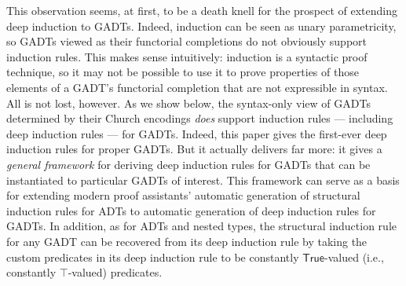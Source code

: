 \documentclass[sigplan,screen]{acmart}
\begin{document}
This observation seems, at first, to be a death knell for the prospect
of extending deep induction to GADTs. Indeed, induction can be seen as
unary parametricity, so GADTs viewed as their functorial completions
do not obviously support induction rules.  This makes sense
intuitively: induction is a syntactic proof technique, so it may not
be possible to use it to prove properties of those elements of a
GADT's functorial completion that are not expressible in syntax. All
is not lost, however. As we show below, the syntax-only view of GADTs
determined by their Church encodings {\em does} support induction
rules --- including deep induction rules --- for GADTs. Indeed, this
paper gives the first-ever deep induction rules
for proper GADTs.
But it actually delivers far more: it gives a {\em general framework}
for deriving deep induction rules for GADTs that can be instantiated
to particular GADTs of interest. This framework can serve as a basis
for extending modern proof assistants' automatic generation of
structural induction rules for ADTs to automatic generation of deep
induction rules for GADTs. In addition, as for ADTs and nested types,
the structural induction rule for any GADT can be recovered from its
deep induction rule by taking the custom predicates in its deep
induction rule to be constantly $\mathsf{True}$-valued (i.e.,
constantly $\mathsf{\top}$-valued) predicates.
\end{document}
